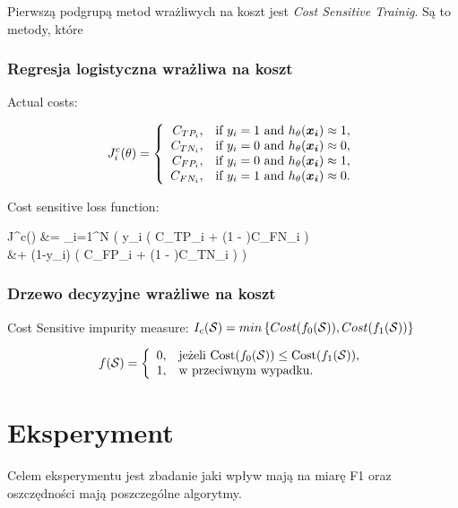 \documentclass{book}
\begin{document}
		Pierwszą podgrupą metod wrażliwych na koszt jest \textit{Cost Sensitive Trainig}. Są to metody, które 
	
	\subsection{Regresja logistyczna wrażliwa na koszt}
	
	    Actual costs:
	
		$$
		J^c_i(\theta)=\left\{
		\begin{array}{rl}
		C_{TP_i}, &\mbox{if $y_i = 1$ and $h_{\theta}(\boldsymbol{x_i}) \approx 1$}, \\
		C_{TN_i}, &\mbox{if $y_i = 0$ and $h_{\theta}(\boldsymbol{x_i}) \approx 0$}, \\
		C_{FP_i}, &\mbox{if $y_i = 0$ and $h_{\theta}(\boldsymbol{x_i}) \approx 1$}, \\
		C_{FN_i}, &\mbox{if $y_i = 1$ and $h_{\theta}(\boldsymbol{x_i}) \approx 0$}.
		\end{array}
		\right.
		$$
		
		Cost sensitive loss function:
		\begin{talign*}
			J^c(\theta) &=  \sum_{i=1}^{N} \bigg( y_i \Big( \htx C_{TP_i} + (1 - \htx)C_{FN_i} \Big) \\
			&+ (1-y_i) \Big( \htx C_{FP_i} + (1 - \htx)C_{TN_i} \Big) \bigg)
		\end{talign*}
	
	\subsection{Drzewo decyzyjne wrażliwe na koszt}
	
	
	
		
		Cost Sensitive impurity measure:
		$ I_c(\mathcal{S}) = min \left\{ Cost(f_0(\mathcal{S})), Cost(f_1(\mathcal{S})) \right\}$
		
		$$ f(\mathcal{S}) =  \left\{
			\begin{array}{rl}
				0, &\mbox{jeżeli $\text{Cost}(f_0(\mathcal{S})) \leq \text{Cost}(f_1(\mathcal{S}))$}, \\
				1, &\mbox{w przeciwnym wypadku}.
			\end{array}{}
		\right.
		$$
	
	

\chapter{Eksperyment}

Celem eksperymentu jest zbadanie jaki wpływ mają na miarę F1 oraz oszczędności mają poszczególne algorytmy.
\end{document}
